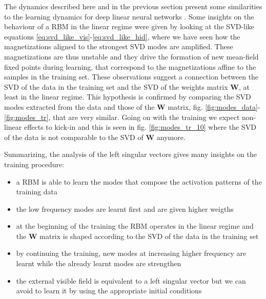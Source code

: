 \documentclass[notitlepage]{revtex4-1}
\begin{document}
The dynamics described here and in the previous section present some similarities to the learning dynamics for deep linear neural networks \cite{ganguli}. Some insights on the behaviour of a RBM in the linear regime were given by looking at the SVD-like equations \eqref{eq:svd_like_vis}-\eqref{eq:svd_like_hid}, where we have seen how the magnetizations aligned to the strongest SVD modes are amplified. These magnetizations are thus unstable and they drive the formation of new mean-field fixed points during learning, that correspond to the magnetizations affine to the samples in the training set. These observations suggest a connection between the SVD of the data in the training set and the SVD of the weights matrix \(\mathbf{W}\), at least in the linear regime. This hypothesis is confirmed by comparing the SVD modes extracted from the data and those of the \(\mathbf{W}\) matrix, fig. \ref{fig:modes_data}-\ref{fig:modes_tr}, that are very similar. Going on with the training we expect non-linear effects to kick-in and this is seen in fig. \ref{fig:modes_tr_10} where the SVD of the data is not comparable to the SVD of \(\mathbf{W}\) anymore.

Summarizing, the analysis of the left singular vectors gives many insights on the training procedure:

\begin{itemize}
\item a RBM is able to learn the modes that compose the activation patterns of the training data
\item the low frequency modes are learnt first and are given higher weigths
\item at the beginning of the training the RBM operates in the linear regime and the \(\mathbf{W}\) matrix is shaped according to the SVD of the data in the training set
\item by continuing the training, new modes at increasing higher frequency are learnt while the already learnt modes are strengthen
\item the external visible field is equivalent to a left singular vector but we can avoid to learn it by using the appropriate initial conditions
\end{itemize}
\end{document}
